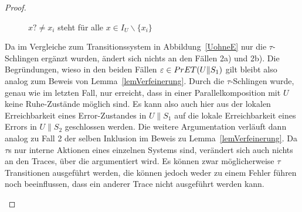 \begin{proof}
\begin{itemize}
\begin{figure} [h!tbp]
\begin{center}
        \caption{$x?\neq x_i$ steht für alle $x\in I_U\backslash\{x_i\}$}
        \label{UohneEmitTau}
      \end{center}
      \end{figure}
      Da im Vergleiche zum Transitionssystem in Abbildung~\ref{UohneE} nur die
      $\tau$-Schlingen ergänzt wurden, ändert sich nichts an den Fällen 2a) und
      2b). Die Begründungen, wieso in den beiden Fällen $\varepsilon\in
      PrET{}(U\|S_1)$ gilt bleibt also analog zum Beweis von
      Lemma~\ref{lemVerfeinerung}. Durch die $\tau$-Schlingen wurde, genau wie
      im letzten Fall, nur erreicht, dass in einer Parallelkomposition mit $U$
      keine Ruhe-Zustände möglich sind. Es kann also auch hier aus der lokalen
      Erreichbarkeit eines Error-Zustandes in $U\|S_1$ auf die lokale
      Erreichbarkeit eines Errors in $U\|S_2$ geschlossen werden. Die weitere
      Argumentation verläuft dann analog zu Fall 2 der selben Inklusion im
      Beweis zu Lemma~\ref{lemVerfeinerung}. Da $\tau$s nur interne Aktionen
      eines einzelnen Systems sind, verändert sich auch nichts an den Traces,
      über die argumentiert wird. Es können zwar möglicherweise $\tau$
      Transitionen ausgeführt werden, die können jedoch weder zu einem Fehler
      führen noch beeinflussen, dass ein anderer Trace nicht ausgeführt werden
      kann.
  \end{itemize}


\end{proof}
